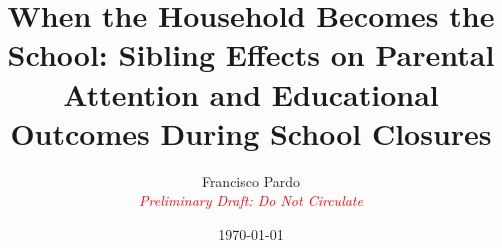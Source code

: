 
\title{When the Household Becomes the School: Sibling Effects on Parental Attention and Educational Outcomes During School Closures} %
\author{
	Francisco Pardo \\
    \textit{\textcolor{red}{Preliminary Draft: Do Not Circulate}}
}
\date{\today}
\JEL{}
\Keywords{}